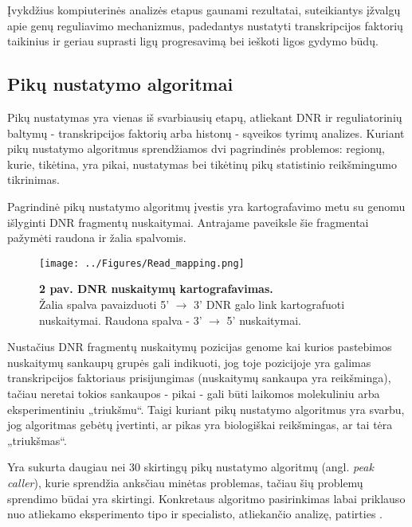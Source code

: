 \documentclass[12pt]{article}
\begin{document}
Įvykdžius kompiuterinės analizės etapus gaunami rezultatai, suteikiantys
įžvalgų apie genų reguliavimo mechanizmus, padedantys nustatyti
transkripcijos faktorių taikinius ir geriau suprasti ligų progresavimą bei
ieškoti ligos gydymo būdų.

\newpage

\subsection{Pikų nustatymo algoritmai}
Pikų nustatymas yra vienas iš svarbiausių etapų, atliekant DNR ir reguliatorinių
baltymų - transkripcijos faktorių arba histonų - sąveikos tyrimų analizes.
Kuriant pikų nustatymo algoritmus sprendžiamos dvi pagrindinės problemos:
regionų, kurie, tikėtina, yra pikai, nustatymas bei tikėtinų pikų statistinio
reikšmingumo tikrinimas.

Pagrindinė pikų nustatymo algoritmų įvestis yra kartografavimo metu su genomu
išlyginti DNR fragmentų nuskaitymai. Antrajame paveiksle šie fragmentai pažymėti
raudona ir žalia spalvomis.

\begin{figure}[ht]
    \begin{center}
        \captionsetup{justification=centering}
        \texttt{[image: ../Figures/Read\_mapping.png]}
        \vspace{-1\baselineskip}
        \caption*{\small\textbf{2 pav. DNR nuskaitymų kartografavimas.}\\Žalia
            spalva pavaizduoti 5' \(\rightarrow\) 3' DNR galo link kartografuoti
            nuskaitymai. Raudona spalva - 3' \(\rightarrow\) 5' nuskaitymai.}
    \end{center}
\end{figure}

Nustačius DNR fragmentų nuskaitymų pozicijas genome kai kurios pastebimos
nuskaitymų sankaupų grupės gali indikuoti, jog toje pozicijoje yra galimas
transkripcijos faktoriaus prisijungimas (nuskaitymų sankaupa yra reikšminga),
tačiau neretai tokios sankaupos - pikai - gali būti laikomos molekuliniu arba
eksperimentiniu „triukšmu“. Taigi kuriant pikų nustatymo algoritmus yra
svarbu, jog algoritmas gebėtų įvertinti, ar pikas yra biologiškai reikšmingas,
ar tai tėra „triukšmas“.

Yra sukurta daugiau nei 30 skirtingų pikų nustatymo algoritmų (angl.
\emph{peak caller}), kurie sprendžia anksčiau minėtas problemas,
tačiau šių problemų sprendimo būdai yra skirtingi. Konkretaus algoritmo
pasirinkimas labai priklauso nuo atliekamo eksperimento tipo ir specialisto,
atliekančio analizę, patirties \cite{ARTICLE13}.
\end{document}
